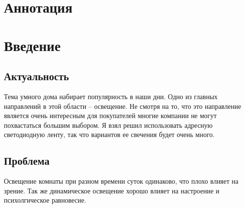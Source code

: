 \documentclass[a4paper, 12pt]{article}
\begin{document}
\section{Аннотация}

\newpage
\section{Введение}
\subsection{Актуальность}




Тема умного дома набирает популярность в наши дни. Одно из главных направлений 
в этой области -- освещение. Не смотря на то, что это направление является 
очень интересным для покупателей многие компании не могут похвастаться большим
выбором. Я взял решил использовать адресную светодиодную ленту, так что 
вариантов ее свечения будет очень много. 

\subsection{Проблема}

Освещение комнаты при разном времени суток одинаково, что плохо влияет на 
зрение. Так же динамическое освещение хорошо влияет на настроение и 
психолгическое равновесие.
\end{document}
